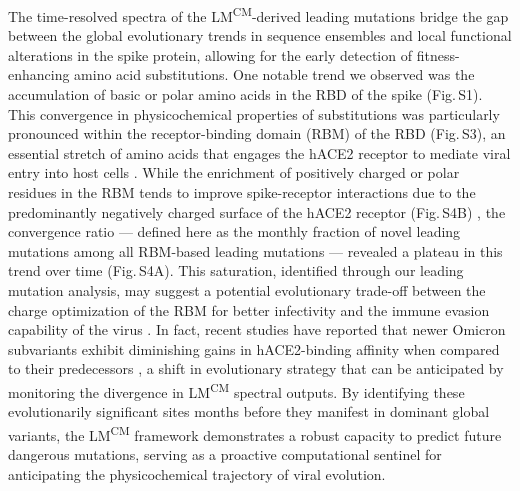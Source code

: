 \documentclass[%
 reprint,
superscriptaddress,
 amsmath,amssymb,
 aps,
]{revtex4-2}
\begin{document}
The time-resolved spectra of the LM\textsuperscript{CM}-derived leading mutations bridge the gap between the global evolutionary trends in sequence ensembles and local functional alterations in the spike protein, allowing for the early detection of fitness-enhancing amino acid substitutions. One notable trend we observed was the accumulation of basic or polar amino acids in the RBD of the spike (Fig.\,S1). This convergence in physicochemical properties of substitutions was particularly pronounced within the receptor-binding domain (RBM) of the RBD (Fig.\,S3), an essential stretch of amino acids that engages the hACE2 receptor to mediate viral entry into host cells \cite{Jackson2022}. While the enrichment of positively charged or polar residues in the RBM tends to improve spike-receptor interactions due to the predominantly negatively charged surface of the hACE2 receptor (Fig.\,S4B) \cite{Jawad2021, 10.1002/cbic.202100681}, the convergence ratio --- defined here as the monthly fraction of novel leading mutations among all RBM-based leading mutations --- revealed a plateau in this trend over time (Fig.\,S4A). This saturation, identified through our leading mutation analysis, may suggest a potential evolutionary trade-off between the charge optimization of the RBM for better infectivity and the immune evasion capability of the virus \cite{10.1093/procel/pwae007}. In fact, recent studies have reported that newer Omicron subvariants exhibit diminishing gains in hACE2-binding affinity when compared to their predecessors \cite{Nguyen2024, Wang31122024}, a shift in evolutionary strategy that can be anticipated by monitoring the divergence in LM\textsuperscript{CM} spectral outputs. By identifying these evolutionarily significant sites months before they manifest in dominant global variants, the LM\textsuperscript{CM} framework demonstrates a robust capacity to predict future dangerous mutations, serving as a proactive computational sentinel for anticipating the physicochemical trajectory of viral evolution.



\end{document}
